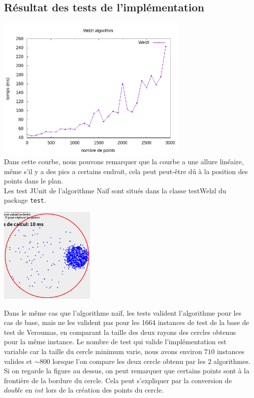 \documentclass[12pt, a4paper, titlepage]{article}
\begin{document}
    \subsection{Résultat des tests de l'implémentation}
        \includegraphics[width=355px,
                        keepaspectratio,]{welzlPoints2.png}\\
        
        Dans cette courbe, nous pouvons remarquer que la courbe a une allure linéaire, même s'il y a des pics a certains endroit, cela peut peut-être dû à la position des points dans le plan.\\
        Les test JUnit de l'algorithme Naïf sont situés dans la classe testWelzl du package \texttt{test}.\\
        \begin{center}
            \includegraphics[width=175px, keepaspectratio,]{Screenshot from 2021-01-24 16-35-13.png}
        \end{center}
        Dans le même cas que l'algorithme naïf, les tests valident l'algorithme pour les cas de base, mais ne les valident pas pour les 1664 instances de test de la base de test de Veroumas, en comparant la taille des deux rayons des cercles obtenus pour la même instance. Le nombre de test qui valide l'implémentation est variable car la taille du cercle minimum varie, nous avons environ $710$ instances valides et $\sim800$ lorsque l'on compare les deux cercle obtenu par les 2 algorithmes. Si on regarde la figure au dessus, on peut remarquer que certains points sont à la frontière de la bordure du cercle. Cela peut s'expliquer par la conversion de $double$ en $int$ lors de la création des points du cercle.
\end{document}
